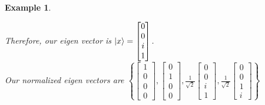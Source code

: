 \documentclass[12pt]{article}
\theoremstyle{plain}
\theoremstyle{nonumberplain}
\theoremstyle{plain}
\newtheorem{example}[lemma]{Example}
\theoremstyle{nonumberplain}
\newcommand\1{{\bf 1}}
\newcommand{\bmat}[1]{\begin{bmatrix*} #1 \end{bmatrix*}} %
\newcommand{\<}{\left\langle}
\renewcommand{\>}{\right\rangle}
\begin{document}
\begin{example}
\begin{center}
Therefore, our eigen vector is $\ket{x}=\bmat{0 \\ 0 \\ i \\ 1}$. \\Our normalized eigen vectors are $\left\lbrace\bmat{1 \\ 0 \\ 0 \\ 0},\bmat{0 \\ 1 \\ 0 \\ 0},\frac{1}{\sqrt{2}}\bmat{0 \\ 0 \\ i \\ 1},\frac{1}{\sqrt{2}}\bmat{0 \\ 0 \\ 1 \\ i}\right\rbrace $
\end{center}
\end{example}
\end{document}
